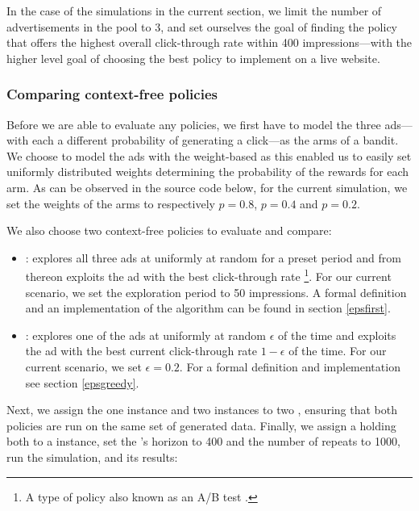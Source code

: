 \documentclass{jss}
\begin{document}
In the case of the simulations in the current section, we limit the number of advertisements in the pool to 3, and set ourselves the goal of finding the policy that offers the highest overall click-through rate within 400 impressions---with the higher level goal of choosing the best policy to implement on a live website.

\subsubsection{Comparing context-free policies} \label{ncp}

Before we are able to evaluate any policies, we first have to model the three ads---with each a different probability of generating a click---as the arms of a bandit. We choose to model the ads with the weight-based  as this enabled us to easily set uniformly distributed weights determining the probability of the rewards for each arm. As can be observed in the source code below, for the current simulation, we set the weights of the arms to respectively $p = 0.8$, $p = 0.4$ and $p = 0.2$.

We also choose two context-free policies to evaluate and compare:

\begin{itemize}
         \item {}: explores all three ads at uniformly at random for a preset period and from thereon exploits the ad with the best click-through rate \footnote{A type of policy also known as an A/B test \cite{Kohavi2007}.}. For our current scenario, we set the exploration period to 50 impressions. A formal definition and an implementation of the algorithm can be found in section \ref{epsfirst}.

         \item {}: explores one of the ads at uniformly at random $\epsilon$ of the time and exploits the ad with the best current click-through rate $1 - \epsilon$ of the time. For our current scenario, we set $\epsilon = 0.2$. For a formal definition and implementation see section \ref{epsgreedy}.
\end{itemize}

Next, we assign the one  instance and two  instances to two , ensuring that both policies are run on the same set of generated data. Finally, we assign a  holding both  to a  instance, set the 's horizon to 400 and the number of repeats to 1000, run the simulation, and  its results:
\end{document}
